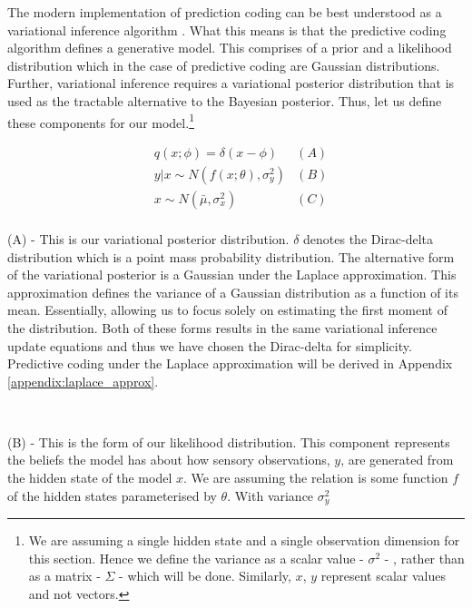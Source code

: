 \documentclass{article}
\begin{document}
The modern implementation of prediction coding can be best understood as a variational inference algorithm \citep{millidge2021applications}. What this means is that the predictive coding algorithm defines a generative model. This comprises of a prior and a likelihood distribution which in the case of predictive coding are Gaussian distributions. Further, variational inference requires a variational posterior distribution that is used as the tractable alternative to the Bayesian posterior. Thus, let us define these components for our model.\footnote{We are assuming a single hidden state and a single observation dimension for this section. Hence we define the variance as a scalar value - $\sigma^2$ - , rather than as a matrix - $\Sigma$ - which will be done. Similarly, $x$, $y$ represent scalar values and not vectors. }

\begin{equation}\label{eq:pc_single_model}
    \begin{aligned}
        & q(x ; \phi) = \delta( x - \phi ) &(A) \\
        & y | x \sim N(f(x	; \theta), \sigma^2_y) &(B) \\
        & x \sim N(\bar{\mu}, \sigma^2_x) &(C) \\ 
    \end{aligned}
\end{equation}

(A) - This is our variational posterior distribution. $\delta$ denotes the Dirac-delta distribution which is a point mass probability distribution. The alternative form of the variational posterior is a Gaussian under the Laplace approximation. \cite{friston2003learning} This approximation defines the variance of a Gaussian distribution as a function of its mean. Essentially, allowing us to focus solely on estimating the first moment of the distribution. Both of these forms results in the same variational inference update equations and thus we have chosen the Dirac-delta for simplicity. Predictive coding under the Laplace approximation will be derived in Appendix \ref{appendix:laplace_approx}. 

\

(B) - This is the form of our likelihood distribution. This component represents the beliefs the model has about how sensory observations, $y$, are generated from the hidden state of the model $x$. We are assuming the relation is some function $f$ of the hidden states parameterised by $\theta$. With variance $\sigma_y^2$
\end{document}
